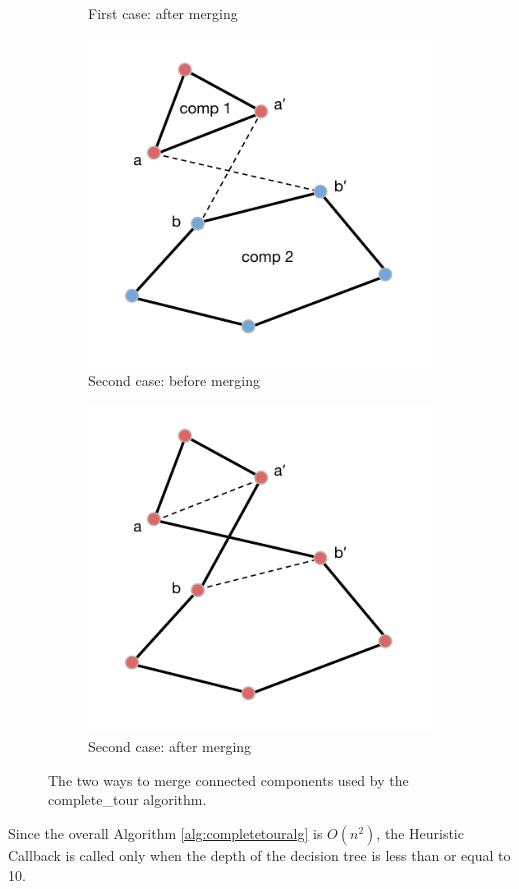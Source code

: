 \begin{figure}[h!]
\begin{subfigure}[b]{0.49\linewidth}
    \caption{First case: after merging}
  \end{subfigure}
  \begin{subfigure}[b]{0.49\linewidth}
    \includegraphics[width=\linewidth]{media/HEU-2_.pdf}
    \caption{Second case: before merging}
  \end{subfigure}
  \begin{subfigure}[b]{0.49\linewidth}
    \includegraphics[width=\linewidth]{media/HEU-2solved2prova.pdf}
    \caption{Second case: after merging}
  \end{subfigure}
  \caption{The two ways to merge connected components used by the complete\_tour algorithm.}
  \label{fig:completetour}
\end{figure}
\clearpage
\noindent
Since the overall Algorithm \ref{alg:completetouralg} is $O(n^2)$, the Heuristic Callback is called only when the depth of the decision tree is less than or equal to 10.
